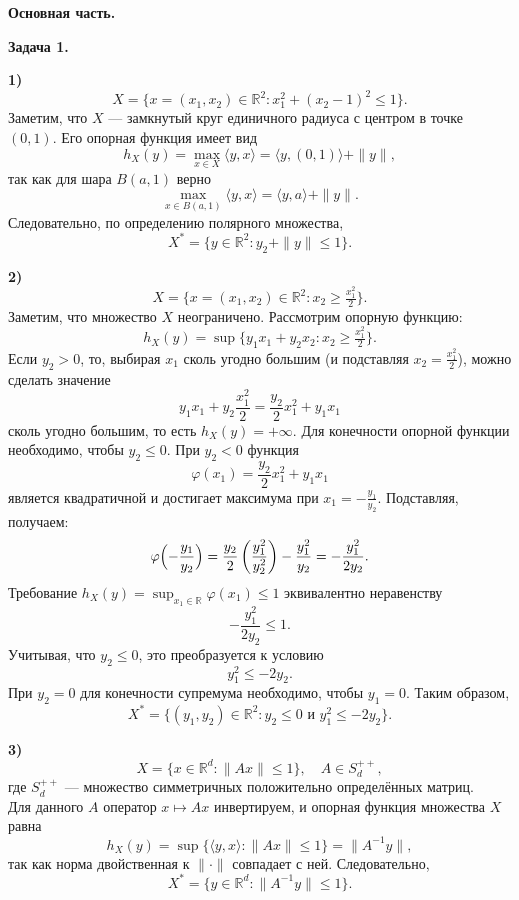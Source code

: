 \documentclass[12pt]{article}
\begin{document}
	
	\title{}
	\author{}
	\date{}
	\maketitle
	
	\textbf{Основная часть.}
	
	\bigskip
	\noindent\textbf{Задача 1.}
	
	\medskip
	\textbf{1)} \quad
	\[
	X = \{ x=(x_1,x_2)\in\mathbb{R}^2 : x_1^2+(x_2-1)^2\le 1 \}.
	\]
	Заметим, что $X$ --- замкнутый круг единичного радиуса с центром в точке $(0,1)$. Его опорная функция имеет вид
	\[
	h_X(y)=\max_{x\in X}\langle y,x\rangle=\langle y,(0,1)\rangle + \|y\|, 
	\]
	так как для шара $B(a,1)$ верно
	\[
	\max_{x\in B(a,1)}\langle y,x\rangle=\langle y,a\rangle+\|y\|.
	\]
	Следовательно, по определению полярного множества,
	\[
	X^*=\{y\in\mathbb{R}^2: y_2+\|y\|\le 1\}.
	\]
	
	\medskip
	\textbf{2)} \quad
	\[
	X=\{ x=(x_1,x_2)\in\mathbb{R}^2: x_2\ge \tfrac{x_1^2}{2} \}.
	\]
	Заметим, что множество $X$ неограничено. Рассмотрим опорную функцию:
	\[
	h_X(y)=\sup\{ y_1x_1+y_2x_2 : x_2\ge \tfrac{x_1^2}{2}\}.
	\]
	Если $y_2>0$, то, выбирая $x_1$ сколь угодно большим (и подставляя $x_2=\tfrac{x_1^2}{2}$), можно сделать значение
	\[
	y_1x_1+y_2\frac{x_1^2}{2}=\frac{y_2}{2}x_1^2+y_1x_1
	\]
	сколь угодно большим, то есть $h_X(y)=+\infty$. Для конечности опорной функции необходимо, чтобы $y_2\le 0$. При $y_2<0$ функция
	\[
	\varphi(x_1)=\frac{y_2}{2}x_1^2+y_1x_1
	\]
	является квадратичной и достигает максимума при $x_1=-\frac{y_1}{y_2}$. Подставляя, получаем:
	\[
	\varphi\Bigl(-\frac{y_1}{y_2}\Bigr)=\frac{y_2}{2}\left(\frac{y_1^2}{y_2^2}\right)-\frac{y_1^2}{y_2}=-\frac{y_1^2}{2y_2}.
	\]
	Требование $h_X(y)=\sup_{x_1\in\mathbb{R}}\varphi(x_1)\le 1$ эквивалентно неравенству
	\[
	-\frac{y_1^2}{2y_2}\le 1.
	\]
	Учитывая, что $y_2\le 0$, это преобразуется к условию
	\[
	y_1^2\le -2y_2.
	\]
	При $y_2=0$ для конечности супремума необходимо, чтобы $y_1=0$. Таким образом,
	\[
	X^*=\{(y_1,y_2)\in\mathbb{R}^2: y_2\le 0 \text{ и } y_1^2\le -2y_2\}.
	\]
	
	\medskip
	\textbf{3)} \quad
	\[
	X=\{ x\in\mathbb{R}^d: \|Ax\|\le 1 \}, \quad A\in S_d^{++},
	\]
	где $S_d^{++}$ --- множество симметричных положительно определённых матриц.
	\\
	Для данного $A$ оператор $x\mapsto Ax$ инвертируем, и опорная функция множества $X$ равна
	\[
	h_X(y)=\sup\{ \langle y,x \rangle: \|Ax\|\le 1\} = \|A^{-1}y\|,
	\]
	так как норма двойственная к $\|\cdot\|$ совпадает с ней. Следовательно,
	\[
	X^*=\{y\in\mathbb{R}^d: \|A^{-1}y\|\le 1\}.
	\]
	
\end{document}
